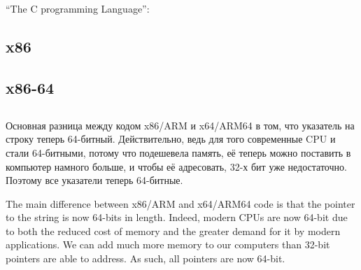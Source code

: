 \chapter{\HelloWorldSectionName}
\label{sec:helloworld}

``The C programming Language''\cite{Kernighan:1988:CPL:576122}:



\section{x86}


\ifdefined\IncludeGCC

\fi

\section{x86-64}

\ifdefined\IncludeGCC

\fi

\ifdefined\IncludeGCC

\fi
\ifdefined\IncludeARM

\fi
\ifdefined\IncludeMIPS

\fi

\section{\Conclusion{}}

\ifdefined\RUSSIAN
Основная разница между кодом x86/ARM и x64/ARM64 в том, что указатель на строку теперь 64-битный.
Действительно, ведь для того современные \ac{CPU} и стали 64-битными, потому что подешевела память,
её теперь можно поставить в компьютер намного больше, и чтобы её адресовать, 32-х бит уже
недостаточно.
Поэтому все указатели теперь 64-битные.
\fi

\ifdefined\ENGLISH
The main difference between x86/ARM and x64/ARM64 code is that the pointer to the string is now 64-bits in length.
Indeed, modern \ac{CPU}s are now 64-bit due to both the reduced cost of memory and the greater demand for it by modern applications. 
We can add much more memory to our computers than 32-bit pointers are able to address.
As such, all pointers are now 64-bit.
\fi

